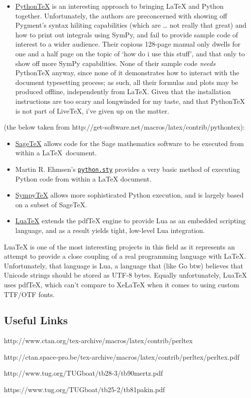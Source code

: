 \begin{itemize}
\itemsep1pt\parskip0pt
\item
  \href{https://github.com/gpoore/pythontex}{PythonTeX} is an
  interesting approach to bringing LaTeX and Python together.
  Unfortunately, the authors are preconcerned with showing off Pygment's
  syntax hiliting capabilities (which are \ldots{} not really that
  great) and how to print out integrals using SymPy, and fail to provide
  sample code of interest to a wider audience. Their copious 128-page
  manual only dwells for one and a half page on the topic of `how do i
  use this stuff', and that only to show off more SymPy capabilities.
  None of their sample code \emph{needs} PythonTeX anyway, since none of
  it demonstrates how to interact with the document typesetting process;
  as such, all their formulas and plots may be produced offline,
  independently from LaTeX. Given that the installation instructions are
  too scary and longwinded for my taste, and that PythonTeX is not part
  of LiveTeX, i've given up on the matter.
\end{itemize}

(the below taken from
http://get-software.net/macros/latex/contrib/pythontex):

\begin{itemize}
\item
  \href{http://www.ctan.org/tex-archive/macros/latex/contrib/sagetex/}{Sage\TeX}
  allows code for the Sage mathematics software to be executed from
  within a \LaTeX~document.
\item
  Martin R. Ehmsen's
  \href{http://www.ctan.org/pkg/python}{\texttt{python.sty}} provides a
  very basic method of executing Python code from within a LaTeX
  document.
\item
  \href{http://elec.otago.ac.nz/w/index.php/SympyTeX}{SympyTeX} allows
  more sophisticated Python execution, and is largely based on a subset
  of SageTeX.
\item
  \href{http://www.luatex.org/}{LuaTeX} extends the pdfTeX engine to
  provide Lua as an embedded scripting language, and as a result yields
  tight, low-level Lua integration.
\end{itemize}

LuaTeX is one of the most interesting projects in this field as it
represents an attempt to provide a close coupling of a real programming
language with LaTeX. Unfortunately, that language is Lua, a language
that (like Go btw) believes that Unicode strings should be stored as
UTF-8 bytes. Equally unfortunately, LuaTeX uses pdfTeX, which can't
compare to XeLaTeX when it comes to using custom TTF/OTF fonts.

\subsection{Useful Links}\label{useful-links}

http://www.ctan.org/tex-archive/macros/latex/contrib/perltex

http://ctan.space-pro.be/tex-archive/macros/latex/contrib/perltex/perltex.pdf

http://www.tug.org/TUGboat/tb28-3/tb90mertz.pdf

https://www.tug.org/TUGboat/tb25-2/tb81pakin.pdf
